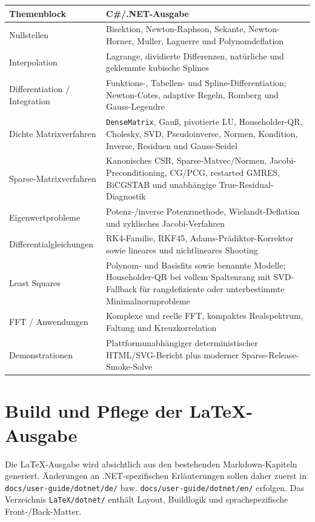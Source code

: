 \documentclass[11pt,a4paper,twoside,openright]{book}
\begin{document}
\begin{longtable}{@{}p{}p{}@{}}
\toprule
\textbf{Themenblock} & \textbf{C\#/.NET-Ausgabe}\\
\midrule
Nullstellen & Bisektion, Newton-Raphson, Sekante, Newton-Horner, Muller, Laguerre und Polynomdeflation\\
Interpolation & Lagrange, dividierte Differenzen, natürliche und geklemmte kubische Splines\\
Differentiation / Integration & Funktions-, Tabellen- und Spline-Differentiation; Newton-Cotes, adaptive Regeln, Romberg und Gauss-Legendre\\
Dichte Matrixverfahren & \texttt{DenseMatrix}, Gauß, pivotierte LU, Householder-QR, Cholesky, SVD, Pseudoinverse, Normen, Kondition, Inverse, Residuen und Gauss-Seidel\\
Sparse-Matrixverfahren & Kanonisches CSR, Sparse-Matvec/Normen, Jacobi-Preconditioning, CG/PCG, restarted GMRES, BiCGSTAB und unabhängige True-Residual-Diagnostik\\
Eigenwertprobleme & Potenz-/inverse Potenzmethode, Wielandt-Deflation und zyklisches Jacobi-Verfahren\\
Differentialgleichungen & RK4-Familie, RKF45, Adams-Prädiktor-Korrektor sowie lineares und nichtlineares Shooting\\
Least Squares & Polynom- und Basisfits sowie benannte Modelle; Householder-QR bei vollem Spaltenrang mit SVD-Fallback für rangdefiziente oder unterbestimmte Minimalnormprobleme\\
FFT / Anwendungen & Komplexe und reelle FFT, kompaktes Realspektrum, Faltung und Kreuzkorrelation\\
Demonstrationen & Plattformunabhängiger deterministischer HTML/SVG-Bericht plus moderner Sparse-Release-Smoke-Solve\\
\bottomrule
\end{longtable}

\chapter{Build und Pflege der LaTeX-Ausgabe}
Die LaTeX-Ausgabe wird absichtlich aus den bestehenden Markdown-Kapiteln generiert. Änderungen an .NET-spezifischen Erläuterungen sollen daher zuerst in \texttt{docs/user-guide/dotnet/de/} bzw. \texttt{docs/user-guide/dotnet/en/} erfolgen. Das Verzeichnis \texttt{LaTeX/dotnet/} enthält Layout, Buildlogik und sprachspezifische Front-/Back-Matter.
\end{document}
